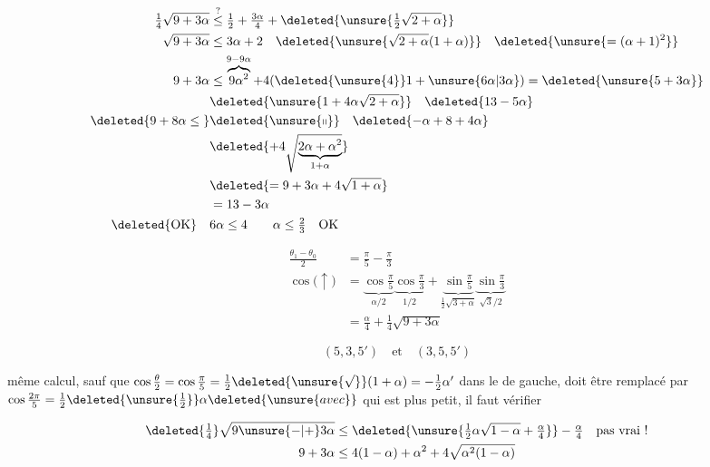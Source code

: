 \[
\begin{aligned}
 \tfrac14\sqrt{9+3\alpha}&\overset?{\leq}\tfrac12+\tfrac{3\alpha}4
 +\deleted{\unsure{\tfrac12\sqrt{2+\alpha}}}\\
 \sqrt{9+3\alpha}&\leq 3\alpha+2\quad
 \deleted{\unsure{\sqrt{2+\alpha}(1+\alpha)}}\quad \deleted{\unsure{=(\alpha+1)^2}}\\
 9+3\alpha&\leq\overbrace{9\alpha^2}^{9-9\alpha}+4(\deleted{\unsure{4}}1+\unsure{6\alpha|3\alpha})
 =\deleted{\unsure{5+3\alpha}}\\
 &\deleted{\unsure{1+4\alpha\sqrt{2+\alpha}}}\quad \deleted{13-5\alpha}\\
 \deleted{9+8\alpha\leq{}}&\deleted{\unsure{\shortparallel}}\quad\deleted{-\alpha+8+4\alpha}\\
 &\deleted{+4\sqrt{\underbrace{2\alpha+\alpha^2}_{1+\alpha}}}\\
 &\deleted{=9+3\alpha+4\sqrt{1+\alpha}}\\
 &=13-3\alpha\\
 \deleted{\text{OK}}\quad&6\alpha\leq4\qquad\alpha\leq\tfrac23\quad\text{OK}
\end{aligned}
\]

\[
\begin{aligned}
 \frac{\theta_1-\theta_0}{2}&=\frac{\pi}{5}-\frac{\pi}{3}\\
 \cos\bigl(\uparrow\bigr)&=\underbrace{\cos\frac{\pi}{5}}_{\alpha/2}
 \underbrace{\cos\frac{\pi}{3}}_{1/2}
 +\underbrace{\sin\frac{\pi}{5}}_{\frac12\sqrt{3+\alpha}}
 \underbrace{\sin\frac{\pi}{3}}_{\sqrt3/2}\\
 &=\frac{\alpha}{4}+\frac14\sqrt{9+3\alpha}
\end{aligned}
\]


\[
 \boxed{(5,3,5')}\quad\text{et}\quad\boxed{(3,5,5')}
\]


même calcul, sauf que 
$\cos\frac{\theta}{2}=\cos\frac{\pi}{5}=\tfrac12\deleted{\unsure{\sqrt{\vphantom1}}}(1+\alpha)=-\tfrac12\alpha'$
dans le  de gauche, doit être remplacé par
$\cos\frac{2\pi}{5}=\frac12\deleted{\unsure{\tfrac12}}\alpha\deleted{\unsure{avec}}$
 
qui est plus petit, il faut vérifier

\[
\begin{aligned}
 \deleted{\tfrac14}\sqrt{9\unsure{-|+}3\alpha}
 &\leq\deleted{\unsure{\tfrac12\alpha\sqrt{1-\alpha}+\tfrac{\alpha}4}}-\tfrac{\alpha}{4}
 \quad\text{pas vrai !}\\
 9+3\alpha&\leq4(1-\alpha)+\alpha^2+4\sqrt{\alpha^2(1-\alpha)}
\end{aligned}
\]
